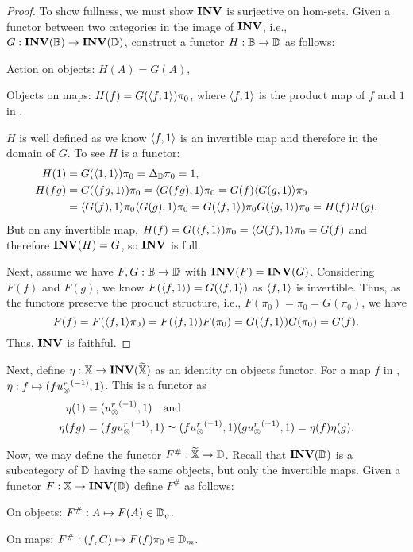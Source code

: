 \begin{proof}
  To show fullness, we must show $\mathbf{INV}$ is surjective on hom-sets. Given a functor between two
  categories in the image of $\mathbf{INV}$, i.e., $G:\mathbf{INV}({\mathbb{B}})\to \mathbf{INV}({\mathbb{D}})$, construct a functor
  $H:\mathbb{B}\to\mathbb{D}$ as follows:
  \begin{description}
    \item{Action on objects:} $H(A) = G(A),$
    \item{Objects on maps:} $H(f) = G(\langle f,1\rangle)\pi_0$, where $\langle f,1\rangle$ is the product map of $f$ and
      $1$ in \B.
  \end{description}

  $H$ is well defined as we know $\langle f,1\rangle$ is an invertible map and therefore in the domain of $G$.
  To see $H$ is a functor:
  \begin{align*}
    H(1) &= G(\langle1,1\rangle)\pi_0 = \Delta_{\mathbb{D}}\pi_0 = 1,\\
    H(f g) &= G(\langle f g,1\rangle)\pi_0 = \langle G(f g),1\rangle\pi_0 = G(f)\langle G(g,1)\rangle\pi_0 \\
    &= \langle G(f),1\rangle\pi_0 \langle G(g),1\rangle\pi_0 = G(\langle f,1\rangle)\pi_0 G(\langle g,1\rangle)\pi_0 = H(f)H(g).
  \end{align*}
  But on any invertible map, $H(f) = G(\langle f,1\rangle)\pi_0 = \langle G(f),1\rangle\pi_0 = G(f)$ and therefore
  $\mathbf{INV}({H}) = G$, so $\mathbf{INV}$ is full.

  Next, assume we have $F,G:\mathbb{B}\to\mathbb{D}$ with $\mathbf{INV}({F}) = \mathbf{INV}({G})$. Considering $F(f)$ and $F(g)$, we
  know $F(\langle f,1\rangle) = G(\langle f,1\rangle) $ as $\langle f,1\rangle$ is invertible. Thus, as the functors preserve the
  product structure, i.e., $F(\pi_0) = \pi_0 = G(\pi_0)$, we have
  \[
    F(f) = F(\langle f,1\rangle\pi_0)= F(\langle f,1\rangle)F(\pi_0)= G(\langle f,1\rangle)G(\pi_0)= G(f).
  \]
  Thus, $\mathbf{INV}$ is faithful.
\end{proof}


Next, define  $\eta:\mathbb{X} \to \mathbf{INV}({\widetilde{\mathbb{X}}})$ as an identity on objects functor. For a map $f$ in
\X, $\eta: f \mapsto (f{u_{\otimes}^r}^{(-1)},1)$. This is a functor as
\begin{align*}
  \eta(1) & = ({u_{\otimes}^r}^{(-1)},1) \quad\text{and}\\
  \eta(f g) &= (f g{u_{\otimes}^r}^{(-1)},1) \overset{\scriptscriptstyle }{\simeq} (f{u_{\otimes}^r}^{(-1)},1)(g{u_{\otimes}^r}^{(-1)},1) = \eta(f)\eta(g).
\end{align*}

Now, we may define the functor $F^{\#}:\widetilde{\mathbb{X}} \to \mathbb{D}$. Recall that $\mathbf{INV}({\mathbb{D}})$ is a subcategory of $\mathbb{D}$
having the same objects, but only the invertible maps. Given a functor $F:\mathbb{X} \to \mathbf{INV}({\mathbb{D}})$ define
$F^{\#}$ as follows:
\begin{description}
  \item{On objects:} $F^{\#}:A \mapsto F(A) \in \mathbb{D}_{o}$.
  \item{On maps:} $F^{\#}:(f,C) \mapsto F(f)\pi_0\in \mathbb{D}_{m}$.
\end{description}

